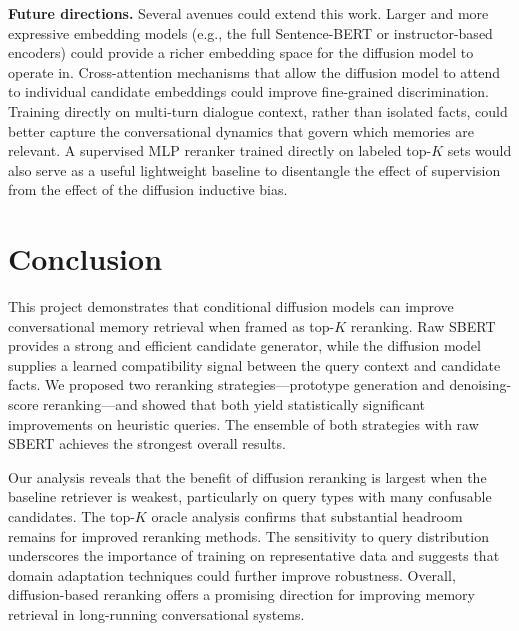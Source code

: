\documentclass{article}
\begin{document}
\textbf{Future directions.} Several avenues could extend this work. Larger and more expressive embedding models (e.g., the full Sentence-BERT or instructor-based encoders) could provide a richer embedding space for the diffusion model to operate in. Cross-attention mechanisms that allow the diffusion model to attend to individual candidate embeddings could improve fine-grained discrimination. Training directly on multi-turn dialogue context, rather than isolated facts, could better capture the conversational dynamics that govern which memories are relevant. A supervised MLP reranker trained directly on labeled top-$K$ sets would also serve as a useful lightweight baseline to disentangle the effect of supervision from the effect of the diffusion inductive bias.

\section{Conclusion}
\label{sec:conclusion}

This project demonstrates that conditional diffusion models can improve conversational memory retrieval when framed as top-$K$ reranking. Raw SBERT provides a strong and efficient candidate generator, while the diffusion model supplies a learned compatibility signal between the query context and candidate facts. We proposed two reranking strategies---prototype generation and denoising-score reranking---and showed that both yield statistically significant improvements on heuristic queries. The ensemble of both strategies with raw SBERT achieves the strongest overall results.

Our analysis reveals that the benefit of diffusion reranking is largest when the baseline retriever is weakest, particularly on query types with many confusable candidates. The top-$K$ oracle analysis confirms that substantial headroom remains for improved reranking methods. The sensitivity to query distribution underscores the importance of training on representative data and suggests that domain adaptation techniques could further improve robustness. Overall, diffusion-based reranking offers a promising direction for improving memory retrieval in long-running conversational systems.

\clearpage
\end{document}
